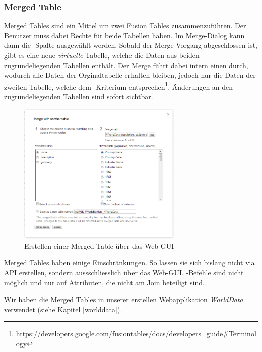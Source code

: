\subsubsection{Merged Table}
\label{merge-table}
Merged Tables sind ein Mittel um zwei Fusion Tables zusammenzuführen. Der Benutzer muss dabei Rechte für beide Tabellen haben. Im \gls{Merge}-Dialog kann dann die -Spalte ausgewählt werden. Sobald der \gls{Merge}-Vorgang abgeschlossen ist, gibt es eine neue \emph{virtuelle} Tabelle, welche die Daten aus beiden zugrundeliegenden Tabellen enthält. Der \gls{Merge} führt dabei intern einen  durch, wodurch alle Daten der Orginaltabelle erhalten bleiben, jedoch nur die Daten der zweiten Tabelle, welche dem -Kriterium entsprechen\footnote{ \url{https://developers.google.com/fusiontables/docs/developers_guide\#Terminology}}. Änderungen an den zugrundeliegenden Tabellen sind sofort sichtbar.

\begin{figure}[!ht]
	\centering
	\includegraphics[width=0.7\textwidth]{images/usecase1-worlddata/documentation/worlddata-merge2}
	\caption{Erstellen einer \gls{Merge}d Table über das Web-GUI}
	\label{create-merge-table}
\end{figure}

Merged Tables haben einige Einschränkungen. So lassen sie sich bislang nicht via API erstellen, sondern aussschliesslich über das Web-GUI. -Befehle sind nicht möglich und  nur auf Attributen, die nicht am Join beteiligt sind.

Wir haben die Merged Tables in unserer erstellen Webapplikation \emph{WorldData} verwendet (siehe Kapitel \ref{worlddata}).

